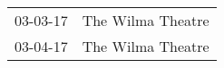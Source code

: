 \begin{supertabular}{p{0.07\textwidth}p{0.23\textwidth}}
 03-03-17 &  The Wilma Theatre \\
 03-04-17 &  The Wilma Theatre \\
\end{supertabular}
